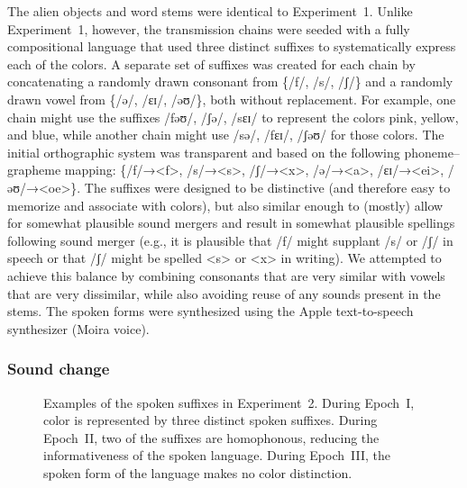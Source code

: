 \documentclass[doc,biblatex]{apa7}
\begin{document}
The alien objects and word stems were identical to Experiment~1. Unlike Experiment~1, however, the transmission chains were seeded with a fully compositional language that used three distinct suffixes to systematically express each of the colors. A separate set of suffixes was created for each chain by concatenating a randomly drawn consonant from \{/f/, /s/, /ʃ/\} and a randomly drawn vowel from \{/ə/, /ɛɪ/, /əʊ/\}, both without replacement. For example, one chain might use the suffixes /fəʊ/, /ʃə/, /sɛɪ/ to represent the colors pink, yellow, and blue, while another chain might use /sə/, /fɛɪ/, /ʃəʊ/ for those colors. The initial orthographic system was transparent and based on the following phoneme–grapheme mapping: \{/f/→<f>, /s/→<s>, /ʃ/→<x>, /ə/→<a>, /ɛɪ/→<ei>, /əʊ/→<oe>\}. The suffixes were designed to be distinctive (and therefore easy to memorize and associate with colors), but also similar enough to (mostly) allow for somewhat plausible sound mergers and result in somewhat plausible spellings following sound merger (e.g., it is plausible that /f/ might supplant /s/ or /ʃ/ in speech or that /ʃ/ might be spelled <s> or <x> in writing). We attempted to achieve this balance by combining consonants that are very similar with vowels that are very dissimilar, while also avoiding reuse of any sounds present in the stems. The spoken forms were synthesized using the Apple text-to-speech synthesizer (Moira voice).

\subsubsection{Sound change}

	\begin{figure}
	\vspace*{2pt}
	\caption{Examples of the spoken suffixes in Experiment~2. During Epoch~I, color is represented by three distinct spoken suffixes. During Epoch~II, two of the suffixes are homophonous, reducing the informativeness of the spoken language. During Epoch~III, the spoken form of the language makes no color distinction.}
	\label{sound_change}
	\end{figure}
\end{document}
